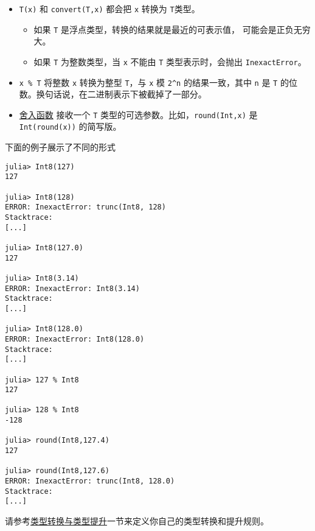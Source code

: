 \begin{itemize}
\item \texttt{T(x)} 和 \texttt{convert(T,x)} 都会把 \texttt{x} 转换为 \texttt{T}类型。

\begin{itemize}
\item 如果 \texttt{T} 是浮点类型，转换的结果就是最近的可表示值， 可能会是正负无穷大。


\item 如果 \texttt{T} 为整数类型，当 \texttt{x} 不能由 \texttt{T} 类型表示时，会抛出 \texttt{InexactError}。

\end{itemize}

\item \texttt{x \% T} 将整数 \texttt{x} 转换为整型 \texttt{T}，与 \texttt{x} 模 \texttt{2{\textasciicircum}n} 的结果一致，其中 \texttt{n} 是 \texttt{T} 的位数。换句话说，在二进制表示下被截掉了一部分。


\item \hyperlink{9997236062216946610}{舍入函数} 接收一个 \texttt{T} 类型的可选参数。比如，\texttt{round(Int,x)} 是 \texttt{Int(round(x))} 的简写版。

\end{itemize}


下面的例子展示了不同的形式




\begin{verbatim}
julia> Int8(127)
127

julia> Int8(128)
ERROR: InexactError: trunc(Int8, 128)
Stacktrace:
[...]

julia> Int8(127.0)
127

julia> Int8(3.14)
ERROR: InexactError: Int8(3.14)
Stacktrace:
[...]

julia> Int8(128.0)
ERROR: InexactError: Int8(128.0)
Stacktrace:
[...]

julia> 127 % Int8
127

julia> 128 % Int8
-128

julia> round(Int8,127.4)
127

julia> round(Int8,127.6)
ERROR: InexactError: trunc(Int8, 128.0)
Stacktrace:
[...]
\end{verbatim}



请参考\hyperlink{10374023657104680331}{类型转换与类型提升}一节来定义你自己的类型转换和提升规则。



\hypertarget{10733784297691347404}{}


